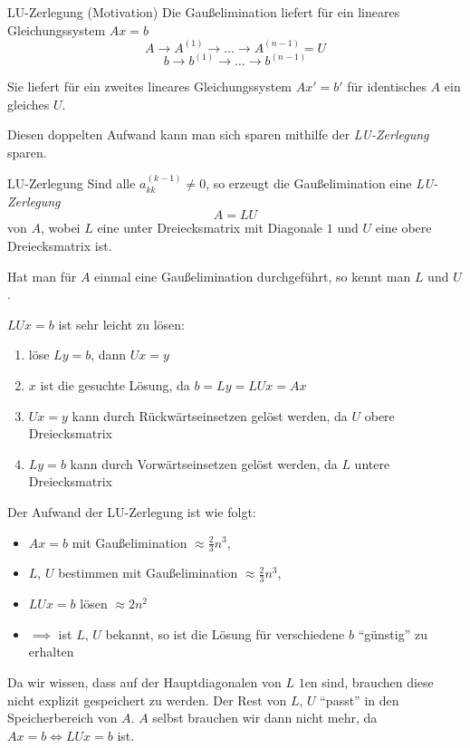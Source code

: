 \begin{bonus}{LU-Zerlegung (Motivation)}
    Die Gaußelimination liefert für ein lineares Gleichungssystem $Ax = b$
    \[
        A \to A^{(1)} \to \ldots \to A^{(n-1)} = U
    \]
    \[
        b \to b^{(1)} \to \ldots \to b^{(n-1)}
    \]

    Sie liefert für ein zweites lineares Gleichungssystem $Ax' = b'$ für identisches $A$ ein gleiches $U$.

    Diesen doppelten Aufwand kann man sich sparen mithilfe der \emph{LU-Zerlegung} sparen.
\end{bonus}

\begin{defi}{LU-Zerlegung}
    Sind alle $a^{(k-1)}_{kk} \neq 0$, so erzeugt die Gaußelimination eine \emph{LU-Zerlegung}
    \[
        A = LU
    \]
    von $A$, wobei $L$ eine unter Dreiecksmatrix mit Diagonale $1$ und $U$ eine obere Dreiecksmatrix ist.

    Hat man für $A$ einmal eine Gaußelimination durchgeführt, so kennt man $L$ und $U$.

    $LUx = b$ ist sehr leicht zu lösen:
    \begin{enumerate}
        \item löse $Ly = b$, dann $Ux = y$
        \item $x$ ist die gesuchte Lösung, da $b = Ly = LUx = Ax$
        \item $Ux = y$ kann durch Rückwärtseinsetzen gelöst werden, da $U$ obere Dreiecksmatrix
        \item $Ly = b$ kann durch Vorwärtseinsetzen gelöst werden, da $L$ untere Dreiecksmatrix
    \end{enumerate}

    Der Aufwand der LU-Zerlegung ist wie folgt:
    \begin{itemize}
        \item $Ax = b$ mit Gaußelimination $\approx \frac{2}{3} n^3$,
        \item $L$, $U$ bestimmen mit Gaußelimination $\approx \frac{2}{3} n^3$,
        \item $LUx = b$ lösen $\approx 2n^2$
        \item $\implies$ ist $L$, $U$ bekannt, so ist die Lösung für verschiedene $b$ \enquote{günstig} zu erhalten
    \end{itemize}

    Da wir wissen, dass auf der Hauptdiagonalen von $L$ $1$en sind, brauchen diese nicht explizit gespeichert zu werden.
    Der Rest von $L$, $U$ \enquote{passt} in den Speicherbereich von $A$.
    $A$ selbst brauchen wir dann nicht mehr, da $Ax = b \iff LUx = b$ ist.
\end{defi}

